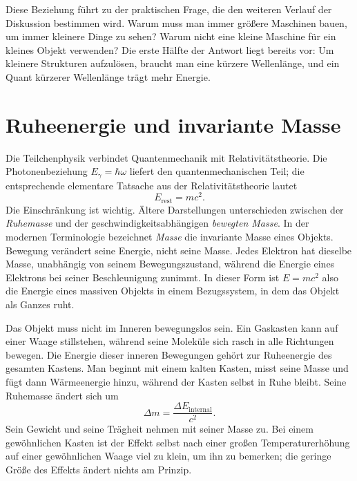Diese Beziehung führt zu der praktischen Frage, die den weiteren Verlauf der Diskussion bestimmen wird. Warum muss man immer größere Maschinen bauen, um immer kleinere Dinge zu sehen? Warum nicht eine kleine Maschine für ein kleines Objekt verwenden? Die erste Hälfte der Antwort liegt bereits vor: Um kleinere Strukturen aufzulösen, braucht man eine kürzere Wellenlänge, und ein Quant kürzerer Wellenlänge trägt mehr Energie.

\section{Ruheenergie und invariante Masse}

Die Teilchenphysik verbindet Quantenmechanik mit Relativitätstheorie. Die Photonenbeziehung \(E_\gamma=\hbar\omega\) liefert den quantenmechanischen Teil; die entsprechende elementare Tatsache aus der Relativitätstheorie lautet
\begin{equation}
E_{\mathrm{rest}}=mc^2.
\end{equation}
Die Einschränkung ist wichtig. Ältere Darstellungen unterschieden zwischen der \emph{Ruhemasse} und der geschwindigkeitsabhängigen \emph{bewegten Masse}. In der modernen Terminologie bezeichnet \emph{Masse} die invariante Masse eines Objekts. Bewegung verändert seine Energie, nicht seine Masse. Jedes Elektron hat dieselbe Masse, unabhängig von seinem Bewegungszustand, während die Energie eines Elektrons bei seiner Beschleunigung zunimmt. In dieser Form ist \(E=mc^2\) also die Energie eines massiven Objekts in einem Bezugssystem, in dem das Objekt als Ganzes ruht.

Das Objekt muss nicht im Inneren bewegungslos sein. Ein Gaskasten kann auf einer Waage stillstehen, während seine Moleküle sich rasch in alle Richtungen bewegen. Die Energie dieser inneren Bewegungen gehört zur Ruheenergie des gesamten Kastens. Man beginnt mit einem kalten Kasten, misst seine Masse und fügt dann Wärmeenergie hinzu, während der Kasten selbst in Ruhe bleibt. Seine Ruhemasse ändert sich um
\begin{equation}
\Delta m=\frac{\Delta E_{\mathrm{internal}}}{c^2}.
\end{equation}
Sein Gewicht und seine Trägheit nehmen mit seiner Masse zu. Bei einem gewöhnlichen Kasten ist der Effekt selbst nach einer großen Temperaturerhöhung auf einer gewöhnlichen Waage viel zu klein, um ihn zu bemerken; die geringe Größe des Effekts ändert nichts am Prinzip.

